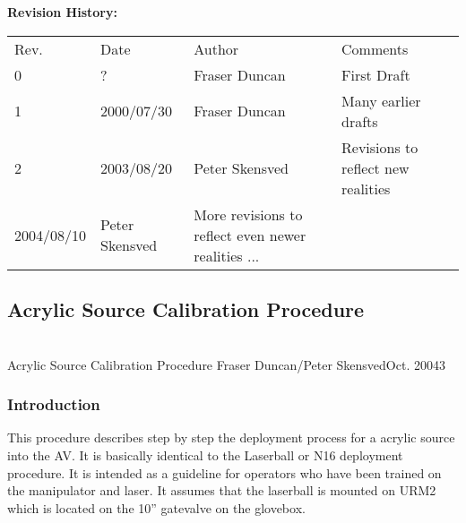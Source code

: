 {\small
~\\
~\\
\noindent
{\bf Revision History:}\\
\begin{tabular}{llll}
Rev. & Date & Author & Comments\\

0             & 
?    & 
Fraser Duncan &
\parbox[t]{3.0in}{
  First Draft
}\\

1             & 
2000/07/30 & 
Fraser Duncan &
\parbox[t]{3.0in}{
  Many earlier drafts
}\\

2     &
2003/08/20 &
Peter Skensved & 
Revisions to reflect new realities  \\
2004/08/10 &
Peter Skensved & 
More revisions to reflect even newer realities ...  \\

\end{tabular}
}



\newpage
\subsection{Acrylic Source Calibration Procedure}
~\\


             {Acrylic Source Calibration Procedure}
             {Fraser Duncan/Peter Skensved}{Oct. 2004}{3}




\subsubsection{Introduction}
   
  This procedure describes step by step the deployment process
for a acrylic source into the AV.  It is basically identical
to the Laserball or N16 deployment procedure.
  It is intended as
a guideline for operators who have been trained on the manipulator
and laser.  It assumes that the laserball is mounted on URM2 which
is located on the 10'' gatevalve on the glovebox.


